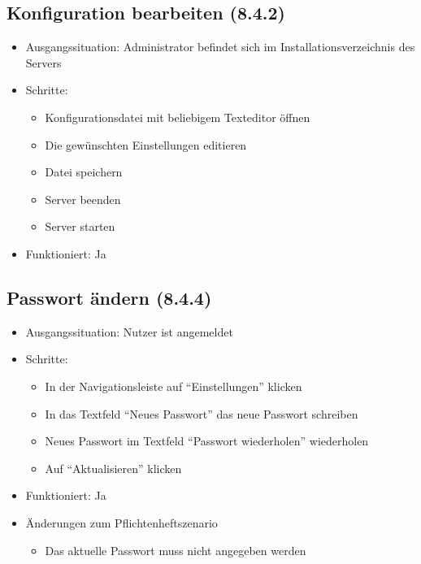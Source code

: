 \documentclass[a4paper]{scrreprt}
\begin{document}
            \subsection{Konfiguration bearbeiten (8.4.2)}
            \begin{itemize}
                \item Ausgangssituation: Administrator befindet sich im Installationsverzeichnis des Servers
                \item Schritte:
                    \begin{itemize}
                        \item Konfigurationsdatei mit beliebigem Texteditor öffnen
                        \item Die gewünschten Einstellungen editieren
                        \item Datei speichern
                        \item Server beenden
                        \item Server starten
                    \end{itemize}
                \item Funktioniert: Ja
            \end{itemize}

            \subsection{Passwort ändern (8.4.4)}
            \begin{itemize}
                \item Ausgangssituation: Nutzer ist angemeldet
                \item Schritte:
                    \begin{itemize}
                        \item In der Navigationsleiste auf \enquote{Einstellungen} klicken
                        \item In das Textfeld \enquote{Neues Passwort} das neue Passwort schreiben
                        \item Neues Passwort im Textfeld \enquote{Passwort wiederholen} wiederholen
                        \item Auf \enquote{Aktualisieren} klicken
                    \end{itemize}
                \item Funktioniert: Ja
                \item Änderungen zum Pflichtenheftszenario
                \begin{itemize}
                    \item Das aktuelle Passwort muss nicht angegeben werden
                \end{itemize}
            \end{itemize}
\end{document}
